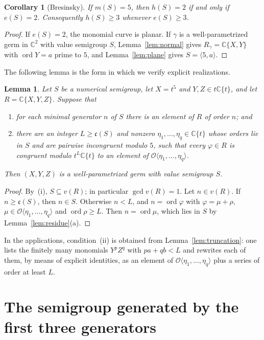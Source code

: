 \documentclass{amsart}
\newtheorem{lemma}[theorem]{Lemma}
\newtheorem{corollary}[theorem]{Corollary}
\theoremstyle{definition}
\theoremstyle{remark}
\numberwithin{equation}{section}
\newcommand{\C}{\mathbb{C}}
\newcommand{\cO}{\mathcal{O}}
\newcommand{\ord}{\operatorname{ord}}
\newcommand{\cond}{\mathfrak{c}}
\newcommand{\gen}[1]{\langle #1\rangle}
\newcommand{\Os}[1]{\cO\langle #1\rangle}
\begin{document}
\begin{corollary}[Bresinsky]\label{cor:planar}
If $m(S)=5$, then $h(S)=2$ if and only if $e(S)=2$. Consequently $h(S)\ge3$ whenever $e(S)\ge3$.
\end{corollary}

\begin{proof}
If $e(S)=2$, the monomial curve is planar. If $\gamma$ is a well-parametrized germ in $\C^2$ with value semigroup $S$, Lemma~\ref{lem:normal} gives $R_\gamma=\C\{X,Y\}$ with $\ord Y=a$ prime to $5$, and Lemma~\ref{lem:plane} gives $S=\gen{5,a}$.
\end{proof}

The following lemma is the form in which we verify explicit realizations.

\begin{lemma}\label{lem:sufficient}
Let $S$ be a numerical semigroup, let $X=t^5$ and $Y,Z\in t\C\{t\}$, and let $R=\C\{X,Y,Z\}$. Suppose that
\begin{enumerate}
\item[(i)] for each minimal generator $n$ of $S$ there is an element of $R$ of order $n$; and
\item[(ii)] there are an integer $L\ge\cond(S)$ and nonzero $\eta_1,\dots,\eta_q\in\C\{t\}$ whose orders lie in $S$ and are pairwise incongruent modulo $5$, such that every $\varphi\in R$ is congruent modulo $t^L\C\{t\}$ to an element of $\Os{\eta_1,\dots,\eta_q}$.
\end{enumerate}
Then $(X,Y,Z)$ is a well-parametrized germ with value semigroup $S$.
\end{lemma}

\begin{proof}
By~(i), $S\subseteq v(R)$; in particular $\gcd v(R)=1$. Let $n\in v(R)$. If $n\ge\cond(S)$, then $n\in S$. Otherwise $n<L$, and $n=\ord\varphi$ with $\varphi=\mu+\rho$, $\mu\in\Os{\eta_1,\dots,\eta_q}$ and $\ord\rho\ge L$. Then $n=\ord\mu$, which lies in $S$ by Lemma~\ref{lem:residue}(a).
\end{proof}

In the applications, condition~(ii) is obtained from Lemma~\ref{lem:truncation}: one lists the finitely many monomials $Y^pZ^q$ with $pa+qb<L$ and rewrites each of them, by means of explicit identities, as an element of $\Os{\eta_1,\dots,\eta_q}$ plus a series of order at least $L$.

\section{The semigroup generated by the first three generators}\label{sec:three}
\end{document}
